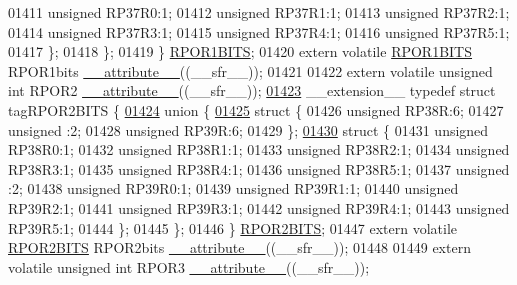 \begin{DoxyCode}
01411       \textcolor{keywordtype}{unsigned} RP37R0:1;
01412       \textcolor{keywordtype}{unsigned} RP37R1:1;
01413       \textcolor{keywordtype}{unsigned} RP37R2:1;
01414       \textcolor{keywordtype}{unsigned} RP37R3:1;
01415       \textcolor{keywordtype}{unsigned} RP37R4:1;
01416       \textcolor{keywordtype}{unsigned} RP37R5:1;
01417     \};
01418   \};
01419 \} \hyperlink{a00014_de/d3d/a00748}{RPOR1BITS};
01420 \textcolor{keyword}{extern} \textcolor{keyword}{volatile} \hyperlink{a00014_de/d3d/a00748}{RPOR1BITS} RPOR1bits \hyperlink{a00015_a493c46f03454991ccc5aa7a6e1dfb2a7}{\_\_attribute\_\_}((\_\_sfr\_\_));
01421 
01422 \textcolor{keyword}{extern} \textcolor{keyword}{volatile} \textcolor{keywordtype}{unsigned} \textcolor{keywordtype}{int}  RPOR2 \hyperlink{a00015_a493c46f03454991ccc5aa7a6e1dfb2a7}{\_\_attribute\_\_}((\_\_sfr\_\_));
\hypertarget{a00015_source_l01423}{}\hyperlink{a00014}{01423} \_\_extension\_\_ \textcolor{keyword}{typedef} \textcolor{keyword}{struct }tagRPOR2BITS \{
\hypertarget{a00015_source_l01424}{}\hyperlink{a00015}{01424}   \textcolor{keyword}{union }\{
\hypertarget{a00015_source_l01425}{}\hyperlink{a00015}{01425}     \textcolor{keyword}{struct }\{
01426       \textcolor{keywordtype}{unsigned} RP38R:6;
01427       \textcolor{keywordtype}{unsigned} :2;
01428       \textcolor{keywordtype}{unsigned} RP39R:6;
01429     \};
\hypertarget{a00015_source_l01430}{}\hyperlink{a00015}{01430}     \textcolor{keyword}{struct }\{
01431       \textcolor{keywordtype}{unsigned} RP38R0:1;
01432       \textcolor{keywordtype}{unsigned} RP38R1:1;
01433       \textcolor{keywordtype}{unsigned} RP38R2:1;
01434       \textcolor{keywordtype}{unsigned} RP38R3:1;
01435       \textcolor{keywordtype}{unsigned} RP38R4:1;
01436       \textcolor{keywordtype}{unsigned} RP38R5:1;
01437       \textcolor{keywordtype}{unsigned} :2;
01438       \textcolor{keywordtype}{unsigned} RP39R0:1;
01439       \textcolor{keywordtype}{unsigned} RP39R1:1;
01440       \textcolor{keywordtype}{unsigned} RP39R2:1;
01441       \textcolor{keywordtype}{unsigned} RP39R3:1;
01442       \textcolor{keywordtype}{unsigned} RP39R4:1;
01443       \textcolor{keywordtype}{unsigned} RP39R5:1;
01444     \};
01445   \};
01446 \} \hyperlink{a00014_da/df2/a00751}{RPOR2BITS};
01447 \textcolor{keyword}{extern} \textcolor{keyword}{volatile} \hyperlink{a00014_da/df2/a00751}{RPOR2BITS} RPOR2bits \hyperlink{a00015_a493c46f03454991ccc5aa7a6e1dfb2a7}{\_\_attribute\_\_}((\_\_sfr\_\_));
01448 
01449 \textcolor{keyword}{extern} \textcolor{keyword}{volatile} \textcolor{keywordtype}{unsigned} \textcolor{keywordtype}{int}  RPOR3 \hyperlink{a00015_a493c46f03454991ccc5aa7a6e1dfb2a7}{\_\_attribute\_\_}((\_\_sfr\_\_));

\end{DoxyCode}
